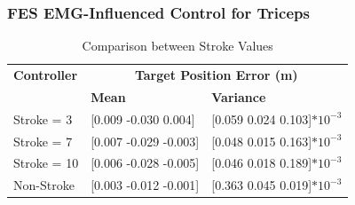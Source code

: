 \subsubsection{FES EMG-Influenced Control for Triceps}


\begin{table}[h]
    \centering
    \scriptsize %
    \caption{Comparison between Stroke Values}
    \begin{tabularx}{\linewidth}{|X|X|X|}
        \hline
        \textbf{Controller} & \multicolumn{2}{c|}{\textbf{Target Position Error (m)}} \\
        \cline{2-3}
        & \textbf{Mean} & \textbf{Variance} \\
        \hline
        Stroke = 3 & [0.009 -0.030 0.004] & [0.059 0.024 0.103]$*10^{-3}$ \\
        \hline
        Stroke = 7  & [0.007 -0.029 -0.003] & [0.048 0.015 0.163]$*10^{-3}$  \\
        \hline
        Stroke = 10 & [0.006 -0.028 -0.005] & [0.046 0.018 0.189]$*10^{-3}$  \\
        \hline
        Non-Stroke & [0.003 -0.012 -0.001] & [0.363 0.045 0.019]$*10^{-3}$  \\
        \hline
    \end{tabularx}
\end{table}


